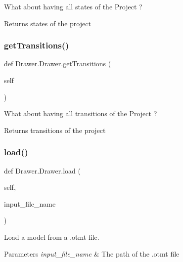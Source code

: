 What about having all states of the Project ? 

\begin{DoxyReturn}{Returns}
states of the project 
\end{DoxyReturn}
\mbox{\label{classDrawer_1_1Drawer_a84e894687f80eef391d57a1aeb14ad74}} 
\subsubsection{\texorpdfstring{getTransitions()}{getTransitions()}}
{\footnotesize\ttfamily def Drawer.\+Drawer.\+get\+Transitions (\begin{DoxyParamCaption}\item[{}]{self }\end{DoxyParamCaption})}



What about having all transitions of the Project ? 

\begin{DoxyReturn}{Returns}
transitions of the project 
\end{DoxyReturn}
\mbox{\label{classDrawer_1_1Drawer_ab0563a671a284efd8f55bb70a883fd4c}} 
\subsubsection{\texorpdfstring{load()}{load()}}
{\footnotesize\ttfamily def Drawer.\+Drawer.\+load (\begin{DoxyParamCaption}\item[{}]{self,  }\item[{}]{input\+\_\+file\+\_\+name }\end{DoxyParamCaption})}



Load a model from a .otmt file. 


\begin{DoxyParams}{Parameters}
{\em input\+\_\+file\+\_\+name} & The path of the .otmt file \\
\hline
\end{DoxyParams}
\mbox{\label{classDrawer_1_1Drawer_ad2f169528e41121dbe082bc62148bbd4}} 

